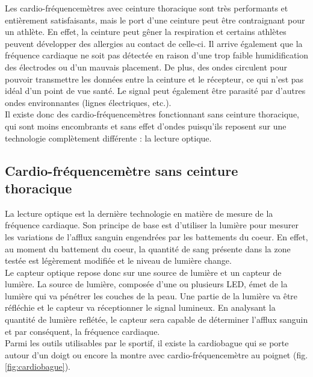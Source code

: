        Les cardio-fréquencemètres avec ceinture thoracique sont très performants et entièrement satisfaisants, mais le port d'une ceinture peut être contraignant pour un athlète. En effet, la ceinture peut gêner la respiration et certains athlètes peuvent développer des allergies au contact de celle-ci. Il arrive également que la fréquence cardiaque ne soit pas détectée en raison d'une trop faible humidification des électrodes ou d'un mauvais placement. De plus, des ondes circulent pour pouvoir transmettre les données entre la ceinture et le récepteur, ce qui n'est pas idéal d'un point de vue santé. Le signal peut également être parasité par d'autres ondes environnantes (lignes électriques, etc.). \\
        
        Il existe donc des cardio-fréquencemètres fonctionnant sans ceinture thoracique, qui sont moins encombrants et sans effet d'ondes puisqu'ils reposent sur une technologie complètement différente : la lecture optique.

         
        \subsection{Cardio-fréquencemètre sans ceinture thoracique}
         
        La lecture optique est la dernière technologie en matière de mesure de la fréquence cardiaque.
        Son principe de base est d'utiliser la lumière pour mesurer les variations de l'afflux sanguin engendrées par les battements du coeur. En effet, au moment du battement du coeur, la quantité de sang présente dans la zone testée est légèrement modifiée et le niveau de lumière change.\\
        
        Le capteur optique repose donc sur une source de lumière et un capteur de lumière. La source de lumière, composée d'une ou plusieurs LED, émet de la lumière qui va pénétrer les couches de la peau. Une partie de la lumière va être réfléchie et le capteur va réceptionner le signal lumineux. En analysant la quantité de lumière reflétée, le capteur sera capable de déterminer l’afflux sanguin et par conséquent, la fréquence cardiaque.\\
        
        Parmi les outils utilisables par le sportif, il existe la cardiobague qui se porte autour d'un doigt ou encore la montre avec cardio-fréquencemètre au poignet (fig. \ref{fig:cardiobague}).
        
